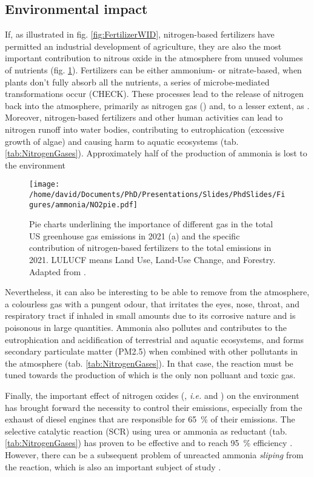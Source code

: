 \subsection{Environmental impact}

If, as illustrated in fig. \ref{fig:FertilizerWID}, nitrogen-based fertilizers have permitted an industrial development of agriculture, they are also the most important contribution to nitrous oxide in the atmosphere from unused volumes of nutrients (fig. \ref{fig:PieGreenhouseNO2}).
Fertilizers can be either ammonium- or nitrate-based, when plants don't fully absorb all the nutrients, a series of microbe-mediated transformations occur (CHECK).
These processes lead to the release of nitrogen back into the atmosphere, primarily as nitrogen gas (\nitrogen) and, to a lesser extent, as \nitrousoxide.
Moreover, nitrogen-based fertilizers and other human activities can lead to nitrogen runoff into water bodies, contributing to eutrophication (excessive growth of algae) and causing harm to aquatic ecosystems (tab. \ref{tab:NitrogenGases}).
Approximately half of the production of ammonia is lost to the environment \parencite{ERISMAN2007}

\begin{figure}[!htb]
    \centering
    \texttt{[image: /home/david/Documents/PhD/Presentations/Slides/PhdSlides/Figures/ammonia/NO2pie.pdf]}
    \caption{
    Pie charts underlining the importance of different gas in the total US greenhouse gas emissions in 2021 (a) and the specific contribution of nitrogen-based fertilizers to the total \nitrousoxide emissions in 2021.
    LULUCF means Land Use, Land-Use Change, and Forestry.
    Adapted from \cite{EPAGreenhouseGases}.
    }
    \label{fig:PieGreenhouseNO2}
\end{figure}

Nevertheless, it can also be interesting to be able to remove \ammonia from the atmosphere, a colourless gas with a pungent odour, that irritates the eyes, nose, throat, and respiratory tract if inhaled in small amounts due to its corrosive nature and is poisonous in large quantities.
Ammonia also pollutes and contributes to the eutrophication and acidification of terrestrial and aquatic ecosystems, and forms secondary particulate matter (PM2.5) when combined with other pollutants in the atmosphere (tab. \ref{tab:NitrogenGases}).
In that case, the reaction must be tuned towards the production of \nitrogen which is the only non polluant and toxic gas.

Finally, the important effect of nitrogen oxides (, \textit{i.e.} \nitricoxide and \nitrogendioxide) on the environment has brought forward the necessity to control their emissions, especially from the exhaust of diesel engines that are responsible for \qty{65}{\percent} of their emissions.
The selective catalytic reaction (SCR) using urea or ammonia as reductant (tab. \ref{tab:NitrogenGases}) has proven to be effective and to reach \qty{95}{\percent} efficiency \parencite{MitsubishiSCR}.
However, there can be a subsequent problem of unreacted ammonia \textit{sliping} from the reaction, which is also an important subject of study \parencite{Thermofischer}.

